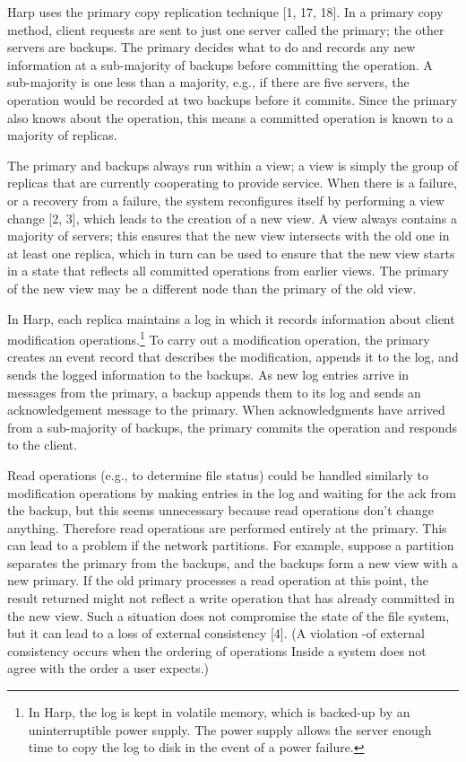 \documentclass[a4paper,11pt,notitlepage,twoside,openright]{article}
\begin{document}
Harp uses the primary copy replication technique {[}1, 17, 18{]}. In a
primary copy method, client requests are sent to just one server called
the primary; the other servers are backups. The primary decides what to
do and records any new information at a sub-majority of backups before
committing the operation. A sub-majority is one less than a majority,
e.g., if there are five servers, the operation would be recorded at two
backups before it commits. Since the primary also knows about the
operation, this means a committed operation is known to a majority of
replicas.

The primary and backups always run within a view; a view is simply the
group of replicas that are currently cooperating to provide service.
When there is a failure, or a recovery from a failure, the system
reconfigures itself by performing a view change {[}2, 3{]}, which leads
to the creation of a new view. A view always contains a majority of
servers; this ensures that the new view intersects with the old one in
at least one replica, which in turn can be used to ensure that the new
view starts in a state that reflects all committed operations from
earlier views. The primary of the new view may be a different node than
the primary of the old view.

In Harp, each replica maintains a log in which it records information
about client modification operations.\footnote{In Harp, the log is kept
  in volatile memory, which is backed-up by an uninterruptible power
  supply. The power supply allows the server enough time to copy the log
  to disk in the event of a power failure.} To carry out a modification
operation, the primary creates an event record that describes the
modification, appends it to the log, and sends the logged information to
the backups. As new log entries arrive in messages from the primary, a
backup appends them to its log and sends an acknowledgement message to
the primary. When acknowledgments have arrived from a sub-majority of
backups, the primary commits the operation and responds to the client.

Read operations (e.g., to determine file status) could be handled
similarly to modification operations by making entries in the log and
waiting for the ack from the backup, but this seems unnecessary because
read operations don't change anything. Therefore read operations are
performed entirely at the primary. This can lead to a problem if the
network partitions. For example, suppose a partition separates the
primary from the backups, and the backups form a new view with a new
primary. If the old primary processes a read operation at this point,
the result returned might not reflect a write operation that has already
committed in the new view. Such a situation does not compromise the
state of the file system, but it can lead to a loss of external
consistency {[}4{]}. (A violation -of external consistency occurs when
the ordering of operations Inside a system does not agree with the order
a user expects.)
\end{document}
